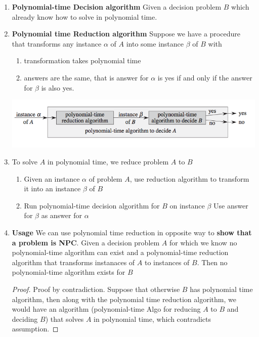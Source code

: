 \documentclass[11pt]{article}
\begin{document}
\begin{defn*}
\begin{enumerate}
\begin{enumerate}
            \item \textbf{Polynomial-time Decision algorithm} Given a decision problem $B$ which already know how to solve in polynomial time. 
            \item \textbf{Polynomial time Reduction algorithm} Suppose we have a procedure that transforms any instance $\alpha$ of $A$ into some instance $\beta$ of $B$ with 
            \begin{enumerate}
                \item transformation takes polynomial time 
                \item answers are the same, that is answer for $\alpha$ is yes if and only if the answer for $\beta$ is also yes. 
            \end{enumerate}
            \includegraphics[width=\textwidth]{reduction.png}
            \item To solve $A$ in polynomial time, we reduce problem $A$ to $B$
            \begin{enumerate}
                \item Given an instance $\alpha$ of problem $A$, use reduction algorithm to transform it into an instance $\beta$ of $B$ 
                \item Run polynomial-time decision algorithm for $B$ on instance $\beta$
                \itme Use answer for $\beta$ as answer for $\alpha$
            \end{enumerate}
            \item \textbf{Usage} We can use polynomial time reduction in opposite way to \textbf{show that a problem is NPC}. Given a decision problem $A$ for which we know no polynomial-time algorithm can exist and a polynomial-time reduction algorithm that transforms instanaces of $A$ to instances of $B$. Then no polynomial-time algorithm exists for $B$
            \begin{proof}
                 Proof by contradiction. Suppose that otherwise $B$ has polynomial time algorithm, then along with the polynomial time reduction algorithm, we would have an algorithm (polynomial-time Algo for reducing $A$ to $B$ and deciding $B$) that solves $A$ in polynomial time, which contradicts assumption. 
            \end{proof}

\end{enumerate}
\end{enumerate}
\end{defn*}
\end{document}
